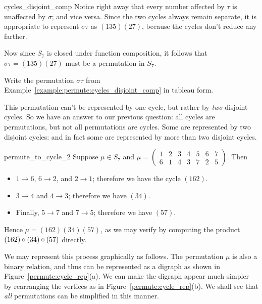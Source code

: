 \begin{example}{cycles_disjoint_comp}
Notice right away that every number affected by $\tau$ is unaffected by $\sigma$; and vice versa. Since the two cycles always  remain separate, it is appropriate to represent $\sigma \tau$ as $(135)(27)$, because the cycles don't reduce any farther.
\end{example}

Now since $S_7$ is closed under function composition, it follows that $\sigma \tau = (135)(27)$ must be a permutation in $S_7$.

\begin{exercise}{}
Write the permutation $\sigma \tau$ from Example~\ref{example:permute:cycles_disjoint_comp} in tableau form.
\end{exercise}

This permutation can't be represented by one cycle, but rather by \emph{two} disjoint cycles.  So we have an answer to our previous question: all cycles are permutations, but not all permutations are cycles.  Some are represented by two disjoint cycles: and in fact some are represented by more than two disjoint cycles.

\begin{example}{permute_to_cycle_2}
Suppose $\mu \in S_7$ and $\mu = \begin{pmatrix} 1 & 2 & 3 & 4 & 5 & 6 & 7 \\ 6 & 1 & 4 & 3 & 7 & 2 & 5 \end{pmatrix}$.  Then
\begin{itemize}
\item
$1 \to 6$, $6 \to 2$, and $2 \to 1$;  therefore we have the cycle $(162)$.
\item
$3 \to 4$ and $4 \to 3$; therefore we have $(34)$. 
\item
Finally, $5 \to 7$ and $7 \to 5$; therefore we have $(57)$. 
\end{itemize}

\noindent
Hence $\mu = (162)(34)(57)$, as we may verify by computing the product $(162)\circ (34)\circ (57)$ directly.

We may represent this process graphically as follows. The permutation $\mu$ is also a binary relation, and thus can be represented as a digraph as shown in Figure~\ref{permute:cycle_rep}(a). We can make the digraph appear much simpler by rearranging the vertices as in Figure~\ref{permute:cycle_rep}(b). We shall see that \emph{all} permutations can be simplified in this manner.
\end{example}

